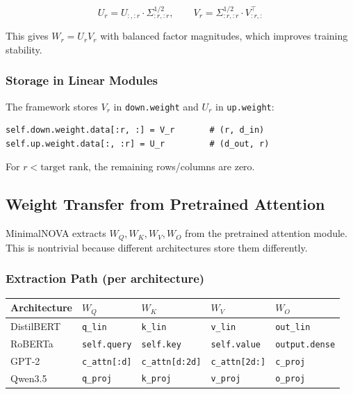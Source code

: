 \[
U_r = U_{:, :r} \cdot \Sigma_{:r, :r}^{1/2}, \qquad
V_r = \Sigma_{:r, :r}^{1/2} \cdot V_{:r, :}^\top
\tag{4.5}
\]

This gives $W_r = U_r V_r$ with balanced factor magnitudes, which improves 
training stability.

\subsubsection{Storage in Linear Modules}

The framework stores $V_r$ in \texttt{down.weight} and $U_r$ in \texttt{up.weight}:

\begin{lstlisting}
self.down.weight.data[:r, :] = V_r       # (r, d_in)
self.up.weight.data[:, :r] = U_r         # (d_out, r)
\end{lstlisting}

For $r < \text{target rank}$, the remaining rows/columns are zero.

\subsection{Weight Transfer from Pretrained Attention}

MinimalNOVA extracts $W_Q, W_K, W_V, W_O$ from the pretrained attention 
module. This is nontrivial because different architectures store them 
differently.

\subsubsection{Extraction Path (per architecture)}

\begin{table}[H]
\centering
\small
\begin{tabular}{lllll}
\toprule
\textbf{Architecture} & \textbf{$W_Q$} & \textbf{$W_K$} & \textbf{$W_V$} & \textbf{$W_O$} \\
\midrule
DistilBERT & \texttt{q\_lin} & \texttt{k\_lin} & \texttt{v\_lin} & \texttt{out\_lin} \\
RoBERTa & \texttt{self.query} & \texttt{self.key} & \texttt{self.value} & \texttt{output.dense} \\
GPT-2 & \texttt{c\_attn[:d]} & \texttt{c\_attn[d:2d]} & \texttt{c\_attn[2d:]} & \texttt{c\_proj} \\
Qwen3.5 & \texttt{q\_proj} & \texttt{k\_proj} & \texttt{v\_proj} & \texttt{o\_proj} \\
\bottomrule
\end{tabular}
\end{table}

